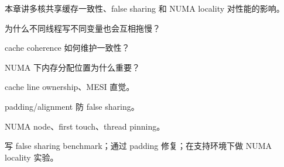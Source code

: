 {本章讲多核共享缓存一致性、false sharing 和 NUMA locality 对性能的影响。}
{\item 为什么不同线程写不同变量也会互相拖慢？
\item cache coherence 如何维护一致性？
\item NUMA 下内存分配位置为什么重要？}
{\item cache line ownership、MESI 直觉。
\item padding/alignment 防 false sharing。
\item NUMA node、first touch、thread pinning。}
{写 false sharing benchmark；通过 padding 修复；在支持环境下做 NUMA locality 实验。}
